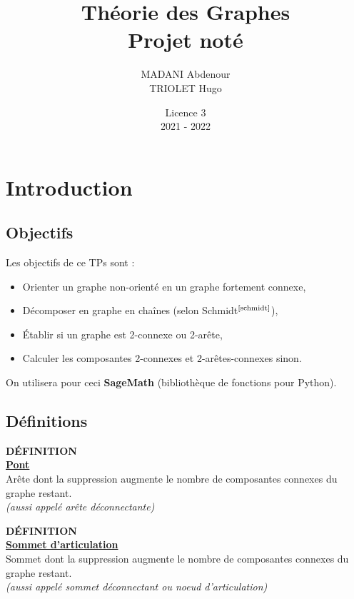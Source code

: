 \documentclass{article}      %
\title{Théorie des Graphes\\\Large{Projet noté}}
\author{MADANI Abdenour\\TRIOLET Hugo}
\date{Licence 3\\2021 - 2022}
\begin{document}
\normalsize
\maketitle

\renewcommand*\contentsname{Table des matières}
\tableofcontents
\newpage



\section{Introduction}
\subsection{Objectifs}
Les objectifs de ce TPs sont :
\begin{itemize}
  \item Orienter un graphe non-orienté en un graphe fortement connexe,
  \item Décomposer en graphe en chaînes (selon Schmidt$^\text{\cite{schmidt}}$),
  \item Établir si un graphe est 2-connexe ou 2-arête,
  \item Calculer les composantes 2-connexes et 2-arêtes-connexes sinon.
\end{itemize}

On utilisera pour ceci \textbf{SageMath} (bibliothèque de fonctions pour Python).



\subsection{Définitions}
\begin{definition}
{ \scriptsize \textcolor{definition}{ \textbf{DÉFINITION}}}
\vspace{3px}
\\ \underline{\textbf{Pont}}
\vspace{2.5px}
\\ Arête dont la suppression augmente le nombre de composantes connexes du graphe restant.%
\\ \textit{(aussi appelé arête déconnectante)}
\end{definition}

\begin{definition}
{ \scriptsize \textcolor{definition}{ \textbf{DÉFINITION}}}
\vspace{3px}
\\ \underline{\textbf{Sommet d'articulation}}
\vspace{2.5px}
\\ Sommet dont la suppression augmente le nombre de composantes connexes du graphe restant.%
\\ \textit{(aussi appelé sommet déconnectant ou noeud d'articulation)}
\end{definition}
\end{document}
